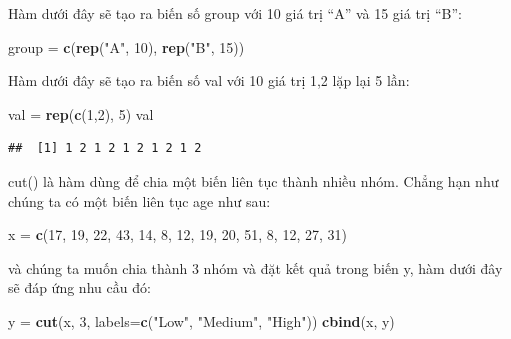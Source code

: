 \documentclass[
]{book}
\newenvironment{Shaded}{\begin{snugshade}}{\end{snugshade}}
\newcommand{\DataTypeTok}[1]{\textcolor[rgb]{0.13,0.29,0.53}{#1}}
\newcommand{\DecValTok}[1]{\textcolor[rgb]{0.00,0.00,0.81}{#1}}
\newcommand{\KeywordTok}[1]{\textcolor[rgb]{0.13,0.29,0.53}{\textbf{#1}}}
\newcommand{\NormalTok}[1]{#1}
\newcommand{\StringTok}[1]{\textcolor[rgb]{0.31,0.60,0.02}{#1}}
\begin{document}
Hàm dưới đây sẽ tạo ra biến số group với 10 giá trị ``A'' và 15 giá trị ``B'':

\begin{Shaded}
\begin{Highlighting}[]
\NormalTok{group =}\StringTok{ }\KeywordTok{c}\NormalTok{(}\KeywordTok{rep}\NormalTok{(}\StringTok{"A"}\NormalTok{, }\DecValTok{10}\NormalTok{), }\KeywordTok{rep}\NormalTok{(}\StringTok{"B"}\NormalTok{, }\DecValTok{15}\NormalTok{))}
\end{Highlighting}
\end{Shaded}

Hàm dưới đây sẽ tạo ra biến số val với 10 giá trị 1,2 lặp lại 5 lần:

\begin{Shaded}
\begin{Highlighting}[]
\NormalTok{val =}\StringTok{ }\KeywordTok{rep}\NormalTok{(}\KeywordTok{c}\NormalTok{(}\DecValTok{1}\NormalTok{,}\DecValTok{2}\NormalTok{), }\DecValTok{5}\NormalTok{)}
\NormalTok{val}
\end{Highlighting}
\end{Shaded}

\begin{verbatim}
##  [1] 1 2 1 2 1 2 1 2 1 2
\end{verbatim}

{cut()} là hàm dùng để chia một biến liên tục thành nhiều nhóm. Chẳng hạn như chúng ta có một biến liên tục age như sau:

\begin{Shaded}
\begin{Highlighting}[]
\NormalTok{x =}\StringTok{ }\KeywordTok{c}\NormalTok{(}\DecValTok{17}\NormalTok{, }\DecValTok{19}\NormalTok{, }\DecValTok{22}\NormalTok{, }\DecValTok{43}\NormalTok{, }\DecValTok{14}\NormalTok{, }\DecValTok{8}\NormalTok{, }\DecValTok{12}\NormalTok{, }\DecValTok{19}\NormalTok{, }\DecValTok{20}\NormalTok{, }\DecValTok{51}\NormalTok{, }\DecValTok{8}\NormalTok{, }\DecValTok{12}\NormalTok{, }\DecValTok{27}\NormalTok{, }\DecValTok{31}\NormalTok{)}
\end{Highlighting}
\end{Shaded}

và chúng ta muốn chia thành 3 nhóm và đặt kết quả trong biến y, hàm dưới đây sẽ đáp ứng nhu cầu đó:

\begin{Shaded}
\begin{Highlighting}[]
\NormalTok{y =}\StringTok{ }\KeywordTok{cut}\NormalTok{(x, }\DecValTok{3}\NormalTok{, }\DataTypeTok{labels=}\KeywordTok{c}\NormalTok{(}\StringTok{"Low"}\NormalTok{, }\StringTok{"Medium"}\NormalTok{, }\StringTok{"High"}\NormalTok{)) }
\KeywordTok{cbind}\NormalTok{(x, y)}
\end{Highlighting}
\end{Shaded}
\end{document}
